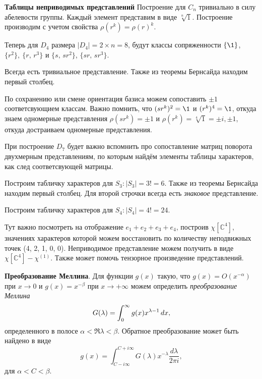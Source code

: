 \textbf{Таблицы неприводимых представлений}
Построение для $C_n$ тривиально в силу абелевости группы. Каждый элемент представим в виде $\sqrt[n]{1}$. Построение производим с учетом свойства $\rho(r^k) = \rho(r)^k$. 

Теперь для $D_4$ размера $|D_4| = 2 \times n = 8$, будут классы сопряженности $\{\1\}$, $\{r^2\},\ \{r,\, r^3\}$ и $\{s,\, s r^2\}$, $\{s r,\, s r^3\}$. 
\begin{center}

\end{center}
Всегда есть тривиальное представление. Также из теоремы Бернсайда находим первый столбец. 

По сохранению или смене ориентация базиса можем сопоставить $\pm 1$ соответсвующием классам.  Важно помнить, что $(s r^k)^2 = \1$ и $(r^k)^4 = \1$, откуда знаем одномерные представления $\rho(s r^k) = \pm 1$ и $\rho(r^k) = \sqrt[4]{1} = \pm i, \pm 1$, откуда достраиваем одномерные представления. 

При построение $D_7$ будет важно вспомнить про сопоставление матриц поворота двухмерным представлениям, по которым найдём элементы таблицы характеров, как след соответсвующей матрицы. 

Построим табличку характеров для $S_3 \colon  |S_3| = 3! = 6$. Также из теоремы Бернсайда находим первый столбец. Для второй строчки всегда есть \textit{знаковое} представление. 
\begin{center}

\end{center}

Построим табличку характеров для $S_4 \colon  |S_4| = 4! = 24$. 
\begin{center}

\end{center}
Тут важно посмотреть на отображение $e_1 + e_2 + e_3 + e_4$, построив $\chi[\mathbb{C}^4]$, значениях характеров которой можем восстановить по количеству неподвижных точек (4, 2, 1, 0, 0). Неприводимое представление можем получить в виде $\chi[\mathbb{C}^4] - \chi^{(1)}$.
Также может помочь тензорное произведение представлений. 

\textbf{Преобразование Меллина}. Для функции $g(x)$ такую, что $g(x) = O(x^{-\alpha})$ при $x \to 0$ и $g(x) = x^{-\beta}$ при $x \to + \infty$ можем определить
\textit{преобразование Меллина}
\begin{equation*}
	G(\lambda) = \int_{0}^{\infty} g(x) x^{\lambda-1} \, d x,
\end{equation*}
определенного в полосе $\alpha < \Re \lambda < \beta$. Обратное преобразование может быть найдено в виде
\begin{equation*}
	g(x) = \int_{C - i \infty}^{C + i \infty} G(\lambda) x^{-\lambda} \frac{d \lambda}{2 \pi i},
\end{equation*} 
для $\alpha  <C < \beta$. 

